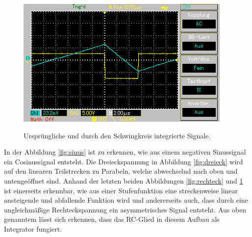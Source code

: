 \begin{figure}[H]
\begin{minipage}{0.48\textwidth}
        \label{fig:rechteck}
        \vspace{1em}
        \includegraphics[width=\textwidth]{content/Grafiken/MAP004.png}
        \label{fig:pwm}
        \vspace{1em}
    \end{minipage}
    \caption{Ursprüngliche und durch den Schwingkreis integrierte Signale.}
\end{figure}
\noindent
In der Abbildung \ref{fig:sinus} ist zu erkennen, wie aus einem negativen Sinussignal ein Cosinussignal entsteht.
Die Dreieckspannung in Abbildung \ref{fig:dreieck} wird auf den linearen Teilstrecken zu Parabeln, welche abwechselnd nach oben und untengeöffnet sind. 
Anhand der letzten beiden Abbildungen \ref{fig:rechteck} und \ref{fig:pwm} ist einerseits erkennbar, wie aus einer Stufenfunktion eine streckenweise linear ansteigende und abfallende Funktion wird und andererseits auch, dass durch eine ungleichmäßige Rechteckspannung ein asymmetrisches Signal entsteht.
Aus oben genanntem lässt sich erkennen, dass das RC-Glied in diesem Aufbau als Integrator fungiert.
